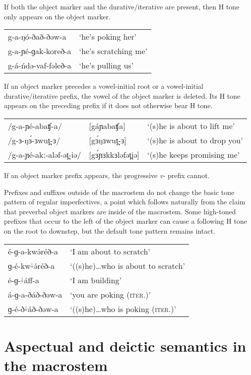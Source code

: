 If both the object marker and the durative/iterative are present, then H tone only appears on the object marker.

\ea 
\begin{tabular}[t]{ll}
g-a-ŋó-ðað-ðəw-a	&	‘he’s poking her’\\
g-a-ɲé-ɡak-koreð-a	&	‘he’s scratching me’\\
g-á-ńdə-vaf-fəleð-a	&	‘he’s pulling us’\\ 	
\end{tabular}
\z 

If an object marker precedes a vowel-initial root or a vowel-initial durative/iterative prefix, the vowel of the object marker is deleted. Its H tone appears on the preceding prefix if it does not otherwise bear H tone.  

\ea 
\begin{tabular}[t]{lll}
/g-a-ɲé-abaʧ-a/	&	[gáɲabaʧa]	&	‘(s)he is about to lift me’ \\
/g-ɜ-ŋɜ́-ɜwut̪-ɜ/	&	[gɜ́ŋɜwut̪-ɜ]	&	‘(s)he is about to drop you’\\
/g-a-ɲé-akː-aləf-ət̪-iə/	&	[gɜ́ɲɜkkɜləfət̪iə]	&	‘(s)he keeps promising me’\\ 	
\end{tabular}
\z 
If an object marker prefix appears, the progressive \textit{v-} prefix cannot. %

Prefixes and suffixes outside of the macrostem do not change the basic tone pattern of regular imperfectives, a point which follows naturally from the claim that preverbal object markers are inside of the macrostem. Some high-toned prefixes that occur to the left of the object marker can cause a following H tone on the root to downstep, but the default tone pattern remains intact.
\ea 
\begin{tabular}[t]{ll}
é-ɡ-a-kwə́réð-a	&	‘I am about to scratch’\\
ɡ-é-kw$^{\downarrow}$ə́réð-a		&	‘((s)he)…who is about to scratch’\\
é-ɡ-$^{\downarrow}$áff-a		&	‘I am building’\\
á-ɡ-a-ðáð-ðəw-a	&	‘you are poking (\textsc{iter}.)’\\
ɡ-é-ð$^{\downarrow}$áð-ðəw-a	&	‘((s)he)…who is poking (\textsc{iter}.)’\\ 
\end{tabular}
\z 


\section{Aspectual and deictic semantics in the macrostem}\label{sec:ch11:macrostemsem}

